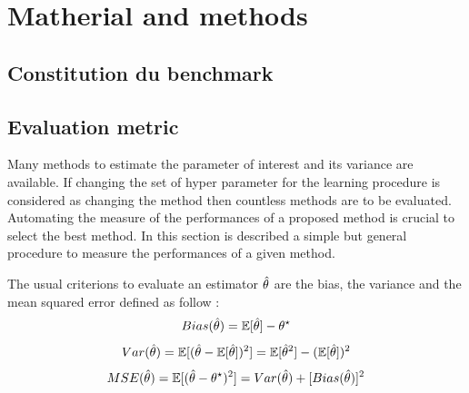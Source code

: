 
\chapter{Matherial and methods}
\label{chap:matherial_methods}
\ifpdf
    \graphicspath{{Chapter3/Figs/Raster/}{Chapter3/Figs/PDF/}{Chapter3/Figs/}}
\else
    \graphicspath{{Chapter3/Figs/Vector/}{Chapter3/Figs/}}
\fi


\section{Constitution du benchmark} %
\label{sec:constitution_du_benchmark}






\section{Evaluation metric} %
\label{sec:evaluation_metric}

Many methods to estimate the parameter of interest and its variance are available.
If changing the set of hyper parameter for the learning procedure is considered as changing the method then countless methods are to be evaluated.
Automating the measure of the performances of a proposed method is crucial to select the best method.
In this section is described a simple but general procedure to measure the performances of a given method.

The usual criterions to evaluate an estimator $\hat\theta$ are the bias, the variance and the mean squared error defined as follow :
\begin{equation}
  Bias(\hat\theta) = \mathbb{E}[\hat\theta] - \theta^\star
\end{equation}
\begin{equation}
  Var(\hat\theta) = \mathbb{E}[ (\hat\theta - \mathbb{E}[\hat\theta])^2 ] = \mathbb{E}[\hat\theta^2] - (\mathbb{E}[\hat\theta])^2
\end{equation}
\begin{equation}
  MSE(\hat\theta) = \mathbb{E}[(\hat\theta - \theta^\star)^2] = Var(\hat\theta) + [Bias(\hat\theta)]^2
\end{equation}

